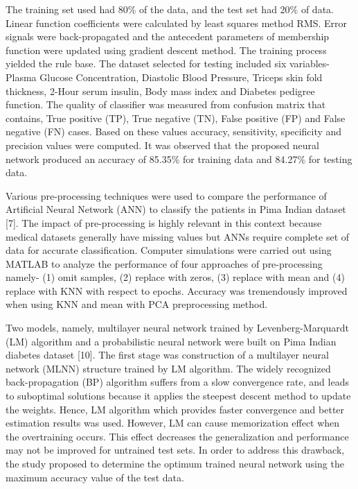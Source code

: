 The training set used had 80\% of the data, and the test set had 20\% of data. Linear function coefficients were calculated by least squares method RMS. Error signals were back-propagated and the antecedent parameters of membership function were updated using gradient descent method.
The training process yielded the rule base. The dataset selected for testing included six variables- Plasma Glucose Concentration, Diastolic Blood Pressure, Triceps skin fold thickness, 2-Hour serum insulin, Body mass index and Diabetes pedigree function.
The quality of classifier was measured from confusion matrix that contains, True positive (TP), True negative (TN), False positive (FP) and False negative (FN) cases. Based on these values accuracy, sensitivity, specificity and precision values were computed. It was observed that the proposed neural network produced an accuracy of 85.35\% for training data and 84.27\% for testing data. \par \noindent
Various pre-processing techniques were used to compare the performance of Artiﬁcial Neural Network (ANN) to classify the patients in Pima Indian dataset [7]. The impact of pre-processing is highly relevant in this context because medical datasets generally have missing values but ANNs require complete set of data for accurate classiﬁcation. Computer simulations were carried out using MATLAB to analyze the performance of four approaches of pre-processing namely- (1) omit samples, (2) replace with zeros, (3) replace with mean and (4) replace with KNN with respect to epochs. Accuracy was tremendously improved when using KNN and mean with PCA preprocessing method. \par \noindent
Two models, namely, multilayer neural network trained by Levenberg-Marquardt (LM) algorithm and a probabilistic neural network were built on Pima Indian diabetes dataset [10].
The first stage was construction of a multilayer neural network (MLNN) structure trained by LM algorithm. The widely recognized back-propagation (BP) algorithm suffers from a slow convergence rate, and leads to suboptimal solutions because it applies the steepest descent method to update the weights. Hence, LM algorithm which provides faster convergence and better estimation results was used. However, LM can cause memorization effect when the overtraining occurs. This effect decreases the generalization and performance may not be improved for untrained test sets. In order to address this drawback, the study proposed to determine the optimum trained neural network using the maximum accuracy value of the test data.
